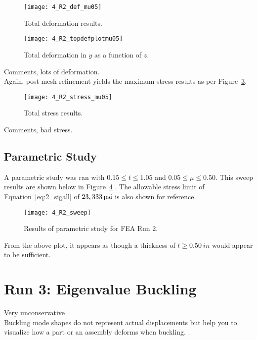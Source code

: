 \begin{figure}[H]
	\centering
	\texttt{[image: 4\_R2\_def\_mu05]}
	\caption{Total deformation results.}
	\label{fig:4_R2_def_mu05}
\end{figure}
\begin{figure}[H]
	\centering
	\texttt{[image: 4\_R2\_topdefplotmu05]}
	\caption{Total deformation in $y$ as a function of $z$.}
	\label{fig:4_R2_topdefplotmu05}
\end{figure}

Comments, lots of deformation.\\

Again, post mesh refinement yields the maximum stress results as per Figure~\ref{fig:4_R2_stress_mu05}.

\begin{figure}[H]
	\centering
	\texttt{[image: 4\_R2\_stress\_mu05]}
	\caption{Total stress results.}
	\label{fig:4_R2_stress_mu05}
\end{figure}

Comments, bad stress.


\subsection{Parametric Study}

A parametric study was ran with $0.15 \leq t \leq 1.05$ and $0.05 \leq \mu \leq 0.50$. This sweep results are shown below in Figure~\ref{fig:4_R2_sweep} \cite{EXCEL}.  The allowable stress limit of Equation~\ref{eq:2_sigall} of $23,333 \,\mathrm{psi}$ is also shown for reference.

\begin{figure}[H]
	\centering
	\texttt{[image: 4\_R2\_sweep]}
	\caption{Results of parametric study for FEA Run 2.}
	\label{fig:4_R2_sweep}
\end{figure}

From the above plot, it appears as though a thickness of $t \geq 0.50\ in$ would appear to be sufficient.


\section{Run 3: Eigenvalue Buckling}

Very unconservative \\

Buckling mode shapes do not represent actual displacements but help you to visualize how a part or an assembly deforms when buckling. \cite{ANSYS}. \\

